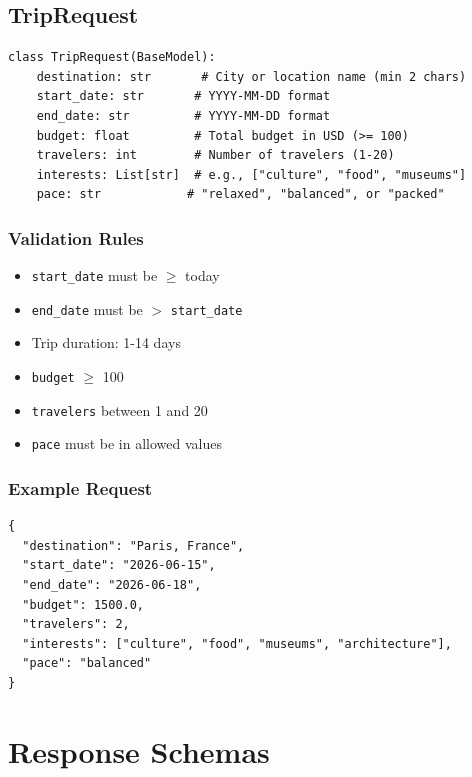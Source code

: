 \documentclass[12pt,a4paper]{report}
\begin{document}
\subsection{TripRequest}

\begin{lstlisting}[style=pythonstyle, caption={TripRequest Schema}]
class TripRequest(BaseModel):
    destination: str       # City or location name (min 2 chars)
    start_date: str       # YYYY-MM-DD format
    end_date: str         # YYYY-MM-DD format
    budget: float         # Total budget in USD (>= 100)
    travelers: int        # Number of travelers (1-20)
    interests: List[str]  # e.g., ["culture", "food", "museums"]
    pace: str            # "relaxed", "balanced", or "packed"
\end{lstlisting}

\subsubsection{Validation Rules}
\begin{itemize}
    \item \texttt{start\_date} must be $\geq$ today
    \item \texttt{end\_date} must be $>$ \texttt{start\_date}
    \item Trip duration: 1-14 days
    \item \texttt{budget} $\geq$ 100
    \item \texttt{travelers} between 1 and 20
    \item \texttt{pace} must be in allowed values
\end{itemize}

\subsubsection{Example Request}

\begin{lstlisting}[style=jsonStyle, caption={Example Trip Request}]
{
  "destination": "Paris, France",
  "start_date": "2026-06-15",
  "end_date": "2026-06-18",
  "budget": 1500.0,
  "travelers": 2,
  "interests": ["culture", "food", "museums", "architecture"],
  "pace": "balanced"
}
\end{lstlisting}

\section{Response Schemas}
\end{document}
